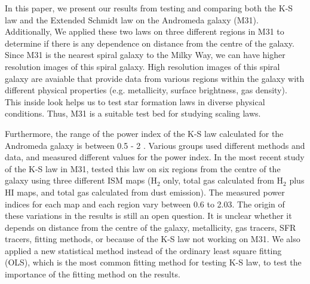 \documentclass[useAMS,usenatbib]{mn2e}
\begin{document}
In this paper, we present our results from testing and comparing both the K-S law and the Extended Schmidt law on the Andromeda galaxy (M31). Additionally, We applied these two laws on three different regions in M31 to determine if there is any dependence on distance from the centre of the galaxy. Since M31 is the nearest spiral galaxy to the Milky Way, we can have higher resolution images of this spiral galaxy. High resolution images of this spiral galaxy are avaiable that provide data from various regions within the galaxy with different physical properties (e.g. metallicity, surface brightness, gas density). This inside look helps us to test star formation laws in diverse physical conditions. Thus, M31 is a suitable test bed for studying scaling laws. %


Furthermore, the range of the power index of the K-S law calculated for the Andromeda galaxy is between 0.5 - 2 \citep[e.g.,][]{Tabatabaei10,Ford13}. Various groups used different methods and data, and measured different values for the power index. In the most recent study of the K-S law in M31, \cite{Ford13} tested this law on six regions from the centre of the galaxy using three different ISM maps (H$_2$ only, total gas calculated from H$_2$ plus HI maps, and total gas calculated from dust emission). The measured power indices for each map and each region vary between 0.6 to 2.03. The origin of these variations in the results is still an open
question. It is unclear whether it depends on distance from the centre of the galaxy, metallicity, gas tracers, SFR tracers, fitting methods, or because of the K-S law not working on M31. We also applied a new statistical method instead of the ordinary least square fitting (OLS), which is the most common fitting method for testing K-S law, to test the importance of the fitting method on the results. %


\end{document}

